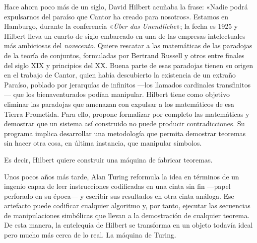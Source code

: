 \documentclass[11pt,a4paper]{article}
\begin{document}
%
%

Hace ahora poco más de un siglo, David Hilbert acuñaba la frase: «Nadie podrá expulsarnos del paraíso que Cantor ha creado para nosotros». Estamos en Hamburgo, durante la conferencia «\emph{Über das Unendliche}»; la fecha es 1925 y Hilbert lleva un cuarto de siglo embarcado en una de las empresas intelectuales más ambiciosas del \emph{novecento}. Quiere rescatar a las matemáticas de las paradojas de la teoría de conjuntos, formuladas por Bertrand Russell y otros entre finales del siglo XIX y principios del XX. Buena parte de esas paradojas tienen su origen en el trabajo de Cantor, quien había descubierto la existencia de un extraño Paraíso, poblado por jerarquías de infinitos ---los llamados cardinales transfinitos--- que los bienaventurados podían manipular. Hilbert tiene como objetivo eliminar las paradojas que amenazan con expulsar a los matemáticos de esa Tierra Prometida. Para ello, propone formalizar por completo las matemáticas y demostrar que un sistema así construido no puede producir contradicciones. Su programa implica desarrollar una metodología que permita demostrar teoremas sin hacer otra cosa, en última instancia, que manipular símbolos. 

Es decir, Hilbert quiere construir una máquina de fabricar teoremas.

Unos pocos años más tarde, Alan Turing reformula la idea en términos de un ingenio capaz de leer instrucciones codificadas en una cinta sin fin ---papel perforado en su época--- y escribir sus resultados en otra cinta análoga. Ese artefacto puede codificar cualquier algoritmo y, por tanto, ejecutar las secuencias de manipulaciones simbólicas que llevan a la demostración de cualquier teorema. De esta manera, la entelequia de Hilbert se transforma en un objeto todavía ideal pero mucho más cerca de lo real. La máquina de Turing. 
\end{document}
